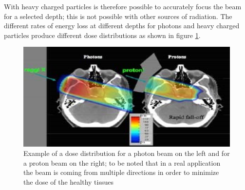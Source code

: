\noindent With heavy charged particles is therefore possible to accurately focus the beam for a selected depth; this is not possible with other sources of radiation.
\newline
The different rates of energy loss at different depths for photons and heavy charged particles produce different dose distributions as shown in figure \ref{fig:Dose}.
\begin{figure}[H]
	\centering
	\includegraphics[width=0.7\linewidth]{IMG/ch1/Dose}
	\caption{Example of a dose distribution for a photon beam on the left and for a proton beam on the right; to be noted that in a real application the beam is coming from multiple directions in order to minimize the dose of the healthy tissues}
	\label{fig:Dose}
\end{figure}

